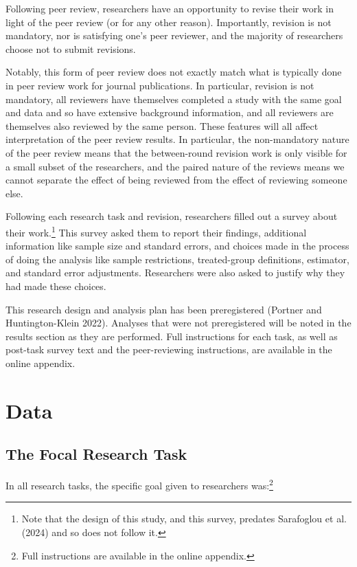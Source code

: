 \documentclass[
  letterpaper,
  DIV=11,
  numbers=noendperiod]{scrartcl}
\begin{document}
Following peer review, researchers have an opportunity to revise their
work in light of the peer review (or for any other reason). Importantly,
revision is not mandatory, nor is satisfying one's peer reviewer, and
the majority of researchers choose not to submit revisions.

Notably, this form of peer review does not exactly match what is
typically done in peer review work for journal publications. In
particular, revision is not mandatory, all reviewers have themselves
completed a study with the same goal and data and so have extensive
background information, and all reviewers are themselves also reviewed
by the same person. These features will all affect interpretation of the
peer review results. In particular, the non-mandatory nature of the peer
review means that the between-round revision work is only visible for a
small subset of the researchers, and the paired nature of the reviews
means we cannot separate the effect of being reviewed from the effect of
reviewing someone else.

Following each research task and revision, researchers filled out a
survey about their work.\footnote{Note that the design of this study,
  and this survey, predates Sarafoglou et al. (2024) and so does not
  follow it.} This survey asked them to report their findings,
additional information like sample size and standard errors, and choices
made in the process of doing the analysis like sample restrictions,
treated-group definitions, estimator, and standard error adjustments.
Researchers were also asked to justify why they had made these choices.

This research design and analysis plan has been preregistered (Portner
and Huntington-Klein 2022). Analyses that were not preregistered will be
noted in the results section as they are performed. Full instructions
for each task, as well as post-task survey text and the peer-reviewing
instructions, are available in the online appendix.

\hypertarget{data}{%
\section{Data}\label{data}}

\hypertarget{sec-focaltask}{%
\subsection{The Focal Research Task}\label{sec-focaltask}}

In all research tasks, the specific goal given to researchers
was:\footnote{Full instructions are available in the online appendix.}
\end{document}
